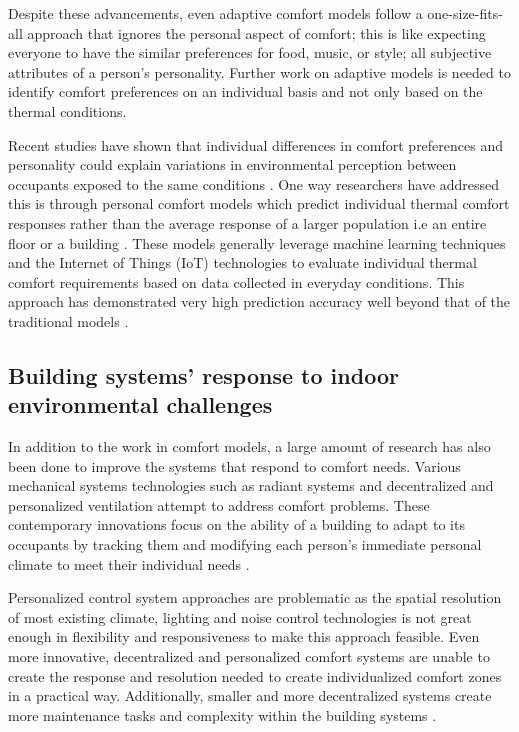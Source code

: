 \documentclass[]{interact}
\theoremstyle{plain}%
\theoremstyle{definition}
\theoremstyle{remark}
\begin{document}
Despite these advancements, even adaptive comfort models follow a one-size-fits-all approach that ignores the personal aspect of comfort; this is like expecting everyone to have the similar preferences for food, music, or style; all subjective attributes of a person’s personality. Further work on adaptive models is needed to identify comfort preferences on an individual basis and not only based on the thermal conditions.  

Recent studies have shown that individual differences in comfort preferences and personality could explain variations in environmental perception between occupants exposed to the same conditions \cite{cheung2019analysis, livcina2018development}. One way researchers have addressed this is through personal comfort models which predict individual thermal comfort responses rather than the average response of a larger population i.e an entire floor or a building \cite{kim2018personal}. These models generally leverage  machine learning techniques and the Internet of Things (IoT) technologies to evaluate individual thermal comfort requirements based on data collected in everyday conditions. This approach has demonstrated very high prediction accuracy well beyond that of the traditional models \cite{kim2018personal1}.





\subsection{Building systems’ response to indoor environmental challenges}
In addition to the work in comfort models, a large amount of research has also been done to improve the systems that respond to comfort needs. Various mechanical systems technologies such as radiant systems and decentralized and personalized ventilation attempt to address comfort problems. These contemporary innovations focus on the ability of a building to adapt to its occupants by tracking them and modifying each person's immediate personal climate to meet their individual needs \citep{Brager2015EvolvingComfort}. 

Personalized control system approaches are problematic as the spatial resolution of most existing climate, lighting and noise control technologies is not great enough in flexibility and responsiveness to make this approach feasible. Even more innovative, decentralized and personalized comfort systems are unable to create the response and resolution needed to create individualized comfort zones in a practical way. Additionally, smaller and more decentralized systems create more maintenance tasks and complexity within the building systems \citep{VESELY2017223}.
\end{document}
